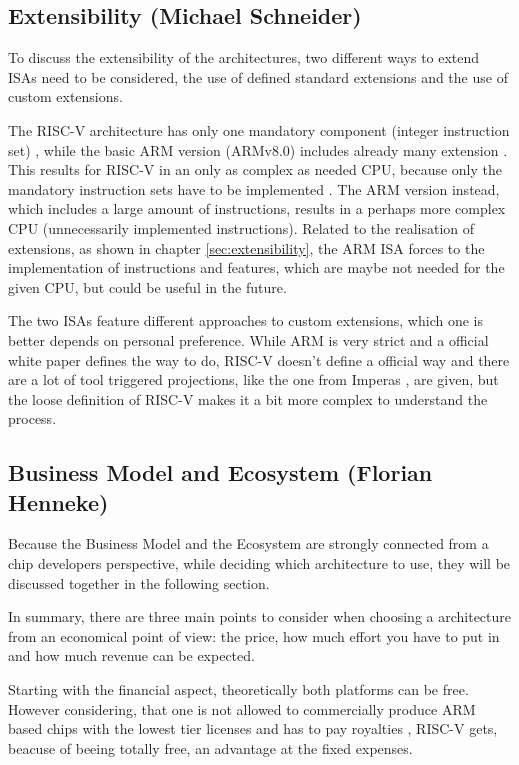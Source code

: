 \documentclass[conference]{IEEEtran}
\begin{document}
\subsection{Extensibility (Michael Schneider)} \label{dis:Extensibility}
	To discuss the extensibility of the architectures, two different ways to extend \glspl{ISA} need to be considered, the use of defined standard extensions and the use of custom extensions. 
	
	The RISC-V architecture has only one mandatory component (integer instruction set) \cite[page 3f]{Waterman2017}, while the basic ARM version (ARMv8.0) includes already many extension \cite[page 8120] {Arm2020}. This results for RISC-V in an only as complex as needed CPU, because only the mandatory instruction sets have to be implemented \cite[page 3f]{Waterman2017}. The ARM version instead, which includes a large amount of instructions, results in a perhaps more complex CPU (unnecessarily implemented instructions). Related to the realisation of extensions, as shown in chapter \ref{sec:extensibility}, the ARM \gls{ISA} forces to the implementation of instructions and features, which are maybe not needed for the given CPU, but could be useful in the future.

	The two \glspl{ISA} feature different approaches to custom extensions, which one is better depends on personal preference. While ARM is very strict and a official white paper \cite{LauranneChoquin2020} defines the way to do, RISC-V doesn't define a official way and there are a lot of tool triggered projections, like the one from Imperas \cite{Limited2019}, are given, but the loose definition of RISC-V makes it a bit more complex to understand the process.

	\subsection{Business Model and Ecosystem (Florian Henneke)}
	Because the Business Model and the Ecosystem are strongly connected from a chip developers perspective, while deciding which architecture to use, they will be discussed together in the following section.

	In summary, there are three main points to consider when choosing a architecture from an economical point of view: the price, how much effort you have to put in and how much revenue can be expected.

	Starting with the financial aspect, theoretically both platforms can be free. However considering, that one is not allowed to commercially produce ARM based chips with the lowest tier licenses and has to pay royalties \cite{ARMLC}, RISC-V gets, beacuse of beeing totally free, an advantage at the fixed expenses.
\end{document}
